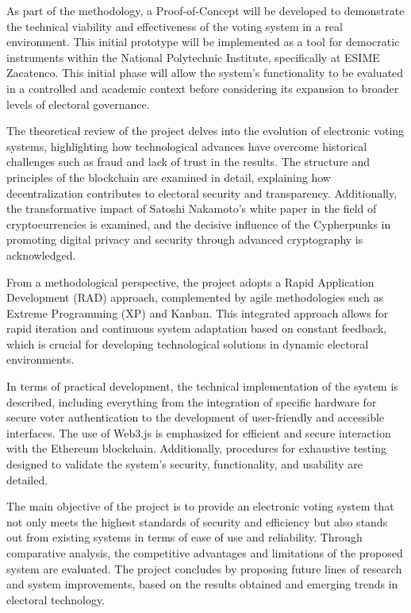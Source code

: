 \documentclass{report}
\begin{document}
	As part of the methodology, a Proof-of-Concept will be developed to demonstrate the technical viability and effectiveness of the voting system in a real environment. This initial prototype will be implemented as a tool for democratic instruments within the National Polytechnic Institute, specifically at ESIME Zacatenco. This initial phase will allow the system's functionality to be evaluated in a controlled and academic context before considering its expansion to broader levels of electoral governance.
	
	The theoretical review of the project delves into the evolution of electronic voting systems, highlighting how technological advances have overcome historical challenges such as fraud and lack of trust in the results. The structure and principles of the blockchain are examined in detail, explaining how decentralization contributes to electoral security and transparency. Additionally, the transformative impact of Satoshi Nakamoto's white paper in the field of cryptocurrencies is examined, and the decisive influence of the Cypherpunks in promoting digital privacy and security through advanced cryptography is acknowledged.
	
	From a methodological perspective, the project adopts a Rapid Application Development (RAD) approach, complemented by agile methodologies such as Extreme Programming (XP) and Kanban. This integrated approach allows for rapid iteration and continuous system adaptation based on constant feedback, which is crucial for developing technological solutions in dynamic electoral environments.
	
	In terms of practical development, the technical implementation of the system is described, including everything from the integration of specific hardware for secure voter authentication to the development of user-friendly and accessible interfaces. The use of Web3.js is emphasized for efficient and secure interaction with the Ethereum blockchain. Additionally, procedures for exhaustive testing designed to validate the system's security, functionality, and usability are detailed.
	
	The main objective of the project is to provide an electronic voting system that not only meets the highest standards of security and efficiency but also stands out from existing systems in terms of ease of use and reliability. Through comparative analysis, the competitive advantages and limitations of the proposed system are evaluated. The project concludes by proposing future lines of research and system improvements, based on the results obtained and emerging trends in electoral technology.
	
\end{document}
